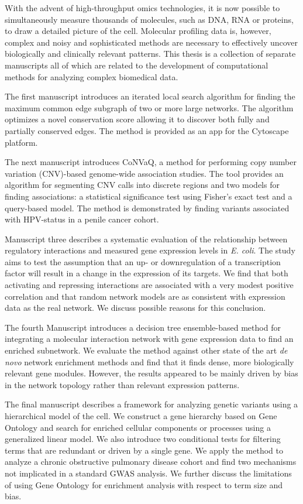 With the advent of high-throughput omics technologies, it is now possible to simultaneously measure thousands of molecules, such as DNA, RNA or proteins, to draw a detailed picture of the cell. Molecular profiling data is, however, complex and noisy and sophisticated methods are necessary to effectively uncover biologically and clinically relevant patterns. This thesis is a collection of separate manuscripts all of which are related to the development of computational methods for analyzing complex biomedical data.  

The first manuscript introduces an iterated local search algorithm for finding the maximum common edge subgraph of two or more large networks. The algorithm optimizes a novel conservation score allowing it to discover both fully and partially conserved edges. The method is provided as an app for the Cytoscape platform.

The next manuscript introduces CoNVaQ, a method for performing copy number variation (CNV)-based genome-wide association studies. The tool provides an algorithm for segmenting CNV calls into discrete regions and two models for finding associations: a statistical significance test using Fisher's exact test and a query-based model. The method is demonstrated by finding variants associated with HPV-status in a penile cancer cohort.

Manuscript three describes a systematic evaluation of the relationship between regulatory interactions and measured gene expression levels in \emph{E. coli}. The study aims to test the assumption that an up- or downregulation of a transcription factor will result in a change in the expression of its targets. We find that both activating and repressing interactions are associated with a very modest positive correlation and that random network models are as consistent with expression data as the real network. We discuss possible reasons for this conclusion.

The fourth Manuscript introduces a decision tree ensemble-based method for integrating a molecular interaction network with gene expression data to find an enriched subnetwork. We evaluate the method against other state of the art \emph{de novo} network enrichment methods and find that it finds dense, more biologically relevant gene modules. However, the results appeared to be mainly driven by bias in the network topology rather than relevant expression patterns.

The final manuscript describes a framework for analyzing genetic variants using a hierarchical model of the cell. We construct a gene hierarchy based on Gene Ontology and search for enriched cellular components or processes using a generalized linear model. We also introduce two conditional tests for filtering terms that are redundant or driven by a single gene. We apply the method to analyze a chronic obstructive pulmonary disease cohort and find two mechanisms not implicated in a standard GWAS analysis. We further discuss the limitations of using Gene Ontology for enrichment analysis with respect to term size and bias.

